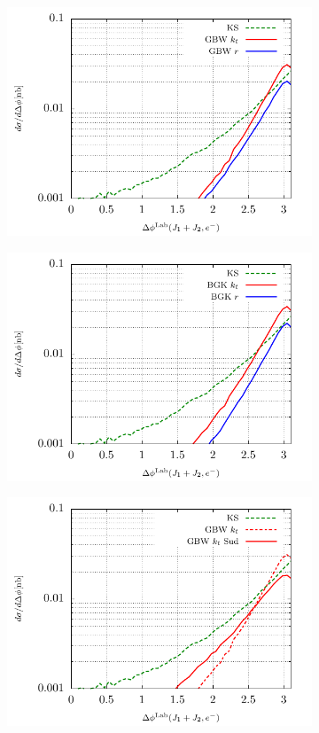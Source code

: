 \documentclass[11pt]{article}
\numberwithin{equation}{section}
\numberwithin{table}{section}
\numberwithin{figure}{section}
\begin{document}
\begin{figure}[p]
	\begin{subfigure}{0.5\textwidth}
		\includegraphics[width=\textwidth]{plots/plotGBW1Lab} 
	\end{subfigure}
	\begin{subfigure}{0.5\textwidth}
		\includegraphics[width=\textwidth]{plots/plotBGK1Lab} 
	\end{subfigure}
	\begin{subfigure}{0.5\textwidth}
		\includegraphics[width=\textwidth]{plots/plotGBW2Lab}

\end{subfigure}
\end{figure}
\end{document}
